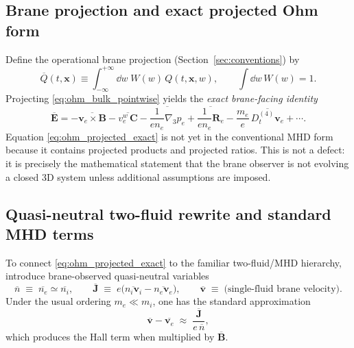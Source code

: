 \documentclass[11pt]{article}
\newcommand{\gradthree}{\nabla_3}
\begin{document}
\subsection{Brane projection and exact projected Ohm form}
\label{subsec:ohm_projected_exact}

Define the operational brane projection (Section~\ref{sec:conventions}) by
\begin{equation}
\overline{Q}(t,\mathbf{x}) \equiv \int_{-\infty}^{+\infty}\dd w\;W(w)\,Q(t,\mathbf{x},w),
\qquad \int\dd w\,W(w)=1.
\label{eq:ohm_proj_def}
\end{equation}
Projecting \eqref{eq:ohm_bulk_pointwise} yields the \emph{exact brane-facing identity}
\begin{equation}
\boxed{
\overline{\mathbf{E}}
=
-\overline{\mathbf{v}_e\times\mathbf{B}}
-\overline{v_e^w\,\mathbf{C}}
-\overline{\frac{1}{e n_e}\gradthree p_e}
+\overline{\frac{1}{e n_e}\mathbf{R}_e}
-\frac{m_e}{e}\,\overline{D_t^{(4)}\mathbf{v}_e}
+\cdots.
}
\label{eq:ohm_projected_exact}
\end{equation}
Equation \eqref{eq:ohm_projected_exact} is not yet in the conventional MHD form because it
contains projected products and projected ratios. This is not a defect: it is precisely the
mathematical statement that the brane observer is not evolving a closed \(3\)D system unless
additional assumptions are imposed.

\subsection{Quasi-neutral two-fluid rewrite and standard MHD terms}
\label{subsec:ohm_twofluid_rewrite_4d}

To connect \eqref{eq:ohm_projected_exact} to the familiar two-fluid/MHD hierarchy, introduce
brane-observed quasi-neutral variables
\begin{equation}
\overline{n}\;\equiv\;\overline{n_e}\simeq \overline{n_i},
\qquad
\overline{\mathbf{J}}\;\equiv\;e\Big(\overline{n_i\mathbf{v}_i}-\overline{n_e\mathbf{v}_e}\Big),
\qquad
\overline{\mathbf{v}}\;\equiv\;\text{(single-fluid brane velocity)}.
\label{eq:ohm_twofluid_vars}
\end{equation}
Under the usual ordering \(m_e\ll m_i\), one has the standard approximation
\begin{equation}
\overline{\mathbf{v}}-\overline{\mathbf{v}_e}
\;\approx\;
\frac{\overline{\mathbf{J}}}{e\,\overline{n}},
\label{eq:v_minus_ve_hall}
\end{equation}
which produces the Hall term when multiplied by \(\overline{\mathbf{B}}\).
\end{document}
